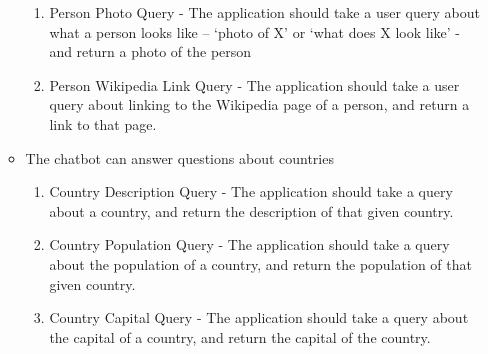 \begin{itemize}
\begin{itemize}
\begin{enumerate}[resume*]
			\item Person Photo Query - The application should take a user query about what a person looks like – ‘photo of X’ or ‘what does X look like’ - and return a photo of the person
			\item Person Wikipedia Link Query - The application should take a user query about linking to the Wikipedia page of a person, and return a link to that page.
		\end{enumerate}
		\item The chatbot can answer questions about countries
		\begin{enumerate}[resume*]
			\item Country Description Query - The application should take a query about a country, and return the description of that given country.
			\item Country Population Query - The application should take a query about the population of a country, and return the population of that given country.
			\item Country Capital Query - The application should take a query about the capital of a country, and return the capital of the country.
			

\end{enumerate}
\end{itemize}
\end{itemize}
